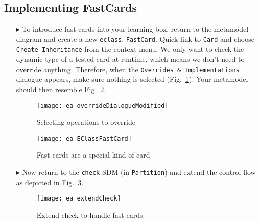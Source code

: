 \newpage
\subsection{Implementing FastCards}
\visHeader
\hypertarget{fastCard vis}{}

\begin{itemize}

\item[$\blacktriangleright$] To introduce fast cards into your learning box, return to the metamodel diagram and create a new \texttt{eclass},
\texttt{FastCard}. Quick link to \texttt{Card} and choose \texttt{Create Inheritance} from the context menu. We only want to check the dynamic type of a
tested card at runtime, which means we don't need to override anything. Therefore, when the \texttt{Overrides \& Implementations} dialogue appears, make sure
nothing is selected (Fig.~\ref{fig:dialogue_override}). Your metamodel should then resemble Fig.~\ref{fig:metamodel_FastCard}.

\vspace{0.5cm}

\begin{figure}[htp]
\begin{center}
  \texttt{[image: ea\_overrideDialogueModified]}
  \caption{Selecting operations to override}  
  \label{fig:dialogue_override}
\end{center}
\end{figure}

\begin{figure}[htp]
\begin{center}
  \texttt{[image: ea\_EClassFastCard]}
  \caption{Fast cards are a special kind of card}  
  \label{fig:metamodel_FastCard}
\end{center}
\end{figure}

\vspace{0.5cm}

\item[$\blacktriangleright$] Now return to the \texttt{check} SDM (in \texttt{Partition}) and extend the control flow as depicted in
Fig.~\ref{fig:extendCheck}.

 \vspace{0.5cm}
 
\begin{figure}[htbp]
\begin{center}
  \texttt{[image: ea\_extendCheck]}
  \caption{Extend check to handle fast cards.}  
  \label{fig:extendCheck}
\end{center}
\end{figure}
 


\end{itemize}
